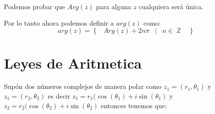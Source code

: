 \documentclass[12pt, fleqn]{report}                             %
\DeclareMathOperator \Space {\quad}                             %
\DeclareMathOperator \MiniSpace {\;}                            %
\newcommand \Such {\MiniSpace|\MiniSpace}                       %
\newcommand{\Set}[1]{\left\{ \MiniSpace #1 \MiniSpace \right\}} %
\newcommand{\Wrap}[1]{\left( #1 \right)}                        %
\DeclareMathOperator \Integers  {\mathbb{Z}}                     %
\newcommand{\Cos}[1]{\cos\Wrap{#1}}
\newcommand{\Sin}[1]{\sin\Wrap{#1}}
\begin{document}
                Podemos probar que $Arg(z)$ para alguna $z$ cualquiera será única.

                Por lo tanto ahora podemos definir a $arg(z)$ como:
                \begin{equation}
                    arg(z) = \Set{ Arg(z) + 2n\pi \Such n \in \Integers }
                \end{equation}


        \clearpage
        \section{Leyes de Aritmetica}
            
            Supón dos números complejos de manera polar como $z_1 = (r_1, \theta_1)$ y $z_1 = (r_2, \theta_2)$ 
            es decir $z_1 = r_1(\Cos{\theta_1} + i\Sin{\theta_1}$ y
            $z_2 = r_2(\Cos{\theta_2} + i\Sin{\theta_2}$ entonces tenemos que:
\end{document}
